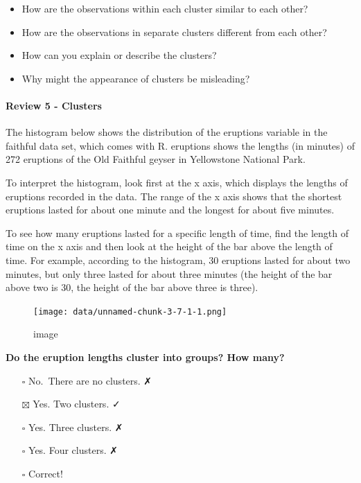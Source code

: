 \documentclass[
]{article}
\providecommand{\tightlist}{%
  \setlength{\itemsep}{0pt}\setlength{\parskip}{0pt}}
\begin{document}
\begin{itemize}
\tightlist
\item
  How are the observations within each cluster similar to each other?
\item
  How are the observations in separate clusters different from each
  other?
\item
  How can you explain or describe the clusters?
\item
  Why might the appearance of clusters be misleading?
\end{itemize}

\hypertarget{review-5---clusters}{%
\paragraph{Review 5 - Clusters}\label{review-5---clusters}}

The histogram below shows the distribution of the eruptions variable in
the faithful data set, which comes with R. eruptions shows the lengths
(in minutes) of 272 eruptions of the Old Faithful geyser in Yellowstone
National Park.

To interpret the histogram, look first at the x axis, which displays the
lengths of eruptions recorded in the data. The range of the x axis shows
that the shortest eruptions lasted for about one minute and the longest
for about five minutes.

To see how many eruptions lasted for a specific length of time, find the
length of time on the x axis and then look at the height of the bar
above the length of time. For example, according to the histogram, 30
eruptions lasted for about two minutes, but only three lasted for about
three minutes (the height of the bar above two is 30, the height of the
bar above three is three).

\begin{figure}
\centering
\texttt{[image: data/unnamed-chunk-3-7-1-1.png]}
\caption{image}
\end{figure}

\textbf{Do the eruption lengths cluster into groups? How many?}

\begin{itemize}
\tightlist
\item[$\square$]
  No.~There are no clusters. ✗
\item[$\boxtimes$]
  Yes. Two clusters. ✓
\item[$\square$]
  Yes. Three clusters. ✗
\item[$\square$]
  Yes. Four clusters. ✗
\item[$\square$]
  Correct!
\end{itemize}
\end{document}
